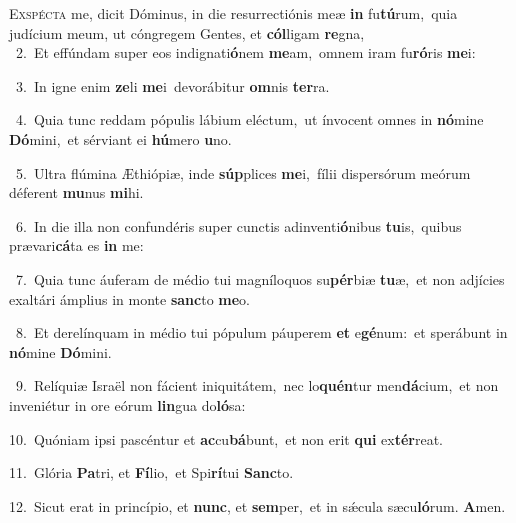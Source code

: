 \lettrine{\initial\textcolor{\initialcolor}{E}}{xspécta} me, dicit Dóminus, in die resurrectiónis meæ \textbf{in} fu\-\textbf{tú}\-rum,~\star quia judícium meum, ut cóngregem Gentes, et \textbf{cól}\-ligam \textbf{re}\-gna,\\
{\numbfont\textcolor{\numbcolor}{~2.}}~Et effúndam super eos indignati\-\textbf{ó}\-nem \textbf{me}\-am,~\star omnem iram fu\-\textbf{ró}\-ris \textbf{me}\-i:\par
{\numbfont\textcolor{\numbcolor}{~3.}}~In igne enim \textbf{ze}\-li \textbf{me}\-i~\star devorábitur \textbf{om}\-nis \textbf{ter}\-ra.\par
{\numbfont\textcolor{\numbcolor}{~4.}}~Quia tunc reddam pópulis lábium eléctum,~\dagger ut ínvocent omnes in \textbf{nó}\-mine \textbf{Dó}\-mini,~\star et sérviant ei \textbf{hú}\-mero \textbf{u}\-no.\par
{\numbfont\textcolor{\numbcolor}{~5.}}~Ultra flúmina Æthiópiæ, inde \textbf{súp}\-plices \textbf{me}\-i,~\star fílii dispersórum meórum déferent \textbf{mu}\-nus \textbf{mi}\-hi.\par
{\numbfont\textcolor{\numbcolor}{~6.}}~In die illa non confundéris super cunctis adinventi\-\textbf{ó}\-nibus \textbf{tu}\-is,~\star quibus prævari\-\textbf{cá}\-ta es \textbf{in} me:\par
{\numbfont\textcolor{\numbcolor}{~7.}}~Quia tunc áuferam de médio tui magníloquos su\-\textbf{pér}\-biæ \textbf{tu}\-æ,~\star et non adjícies exaltári ámplius in monte \textbf{sanc}\-to \textbf{me}\-o.\par
{\numbfont\textcolor{\numbcolor}{~8.}}~Et derelínquam in médio tui pópulum páuperem \textbf{et} e\-\textbf{gé}\-num:~\star et sperábunt in \textbf{nó}\-mine \textbf{Dó}\-mini.\par
{\numbfont\textcolor{\numbcolor}{~9.}}~Relíquiæ Israël non fácient iniquitátem,~\dagger nec lo\-\textbf{quén}\-tur men\-\textbf{dá}\-cium,~\star et non inveniétur in ore eórum \textbf{lin}\-gua do\-\textbf{ló}\-sa:\par
{\numbfont\textcolor{\numbcolor}{10.}}~Quóniam ipsi pascéntur et \textbf{ac}\-cu\-\textbf{bá}\-bunt,~\star et non erit \textbf{qui} ex\-\textbf{tér}\-reat.\par
{\numbfont\textcolor{\numbcolor}{11.}}~Glória \textbf{Pa}\-tri, et \textbf{Fí}\-lio,~\star et Spi\-\textbf{rí}\-tui \textbf{Sanc}\-to.\par
{\numbfont\textcolor{\numbcolor}{12.}}~Sicut erat in princípio, et \textbf{nunc}\-, et \textbf{sem}\-per,~\star et in sǽcula sæcu\-\textbf{ló}\-rum. \textbf{A}\-men.\par
